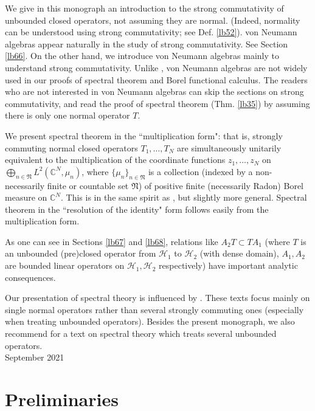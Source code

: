 \documentclass[12pt,b5paper,notitlepage]{article}
\theoremstyle{definition}
\theoremstyle{plain}
\newcommand{\fk}{\mathfrak}
\newcommand{\mc}{\mathcal}
\newcommand{\Cbb}{\mathbb C}
\numberwithin{equation}{section}
\begin{document}
We give in this monograph an introduction to the strong commutativity of unbounded closed operators, not assuming they are normal. (Indeed, normality can be understood using strong commutativity; see Def. \ref{lb52}). von Neumann algebras appear naturally in the study of strong commutativity. See Section \ref{lb66}. On the other hand, we introduce von Neumann algebras mainly to understand strong commutativity. Unlike \cite{Kad}, von Neumann algebras are not widely used in our proofs of spectral theorem and Borel functional calculus. The readers who are not interested in von Neumann algebras can skip the sections on strong commutativity, and read the proof of spectral theorem (Thm. \ref{lb35})  by assuming there  is only one normal operator $T$.

We present spectral theorem in the ``multiplication form": that is, strongly commuting normal closed operators $T_1,\dots,T_N$ are simultaneously unitarily equivalent to the multiplication of the coordinate functions $z_1,\dots,z_N$ on $\bigoplus_{n\in\fk N} L^2(\Cbb^N,\mu_n)$, where $\{\mu_n\}_{n\in\fk N}$ is a collection (indexed by a non-necessarily finite or countable set $\fk N$) of positive finite (necessarily Radon) Borel measure on $\Cbb^N$. This is in the same spirit as \cite{RS}, but slightly more general. Spectral theorem in the ``resolution of the identity" form follows easily from the multiplication form.

As one can see in Sections \ref{lb67} and \ref{lb68}, relations like $A_2T\subset TA_1$ (where $T$ is an unbounded (pre)closed operator from $\mc H_1$ to $\mc H_2$ (with dense domain), $A_1,A_2$ are bounded linear operators on $\mc H_1,\mc H_2$ respectively) have important analytic consequences.

Our presentation of spectral theory is influenced by \cite{Kad,RS,Rud-F}. These texts focus mainly on single normal operators rather than several strongly commuting ones (especially when treating unbounded operators). Besides the present monograph, we also recommend \cite{Sch} for a text on spectral theory which treats several unbounded operators.\\[2ex]


\hfill September 2021

\newpage











\section{Preliminaries}\label{lb63}
\end{document}
